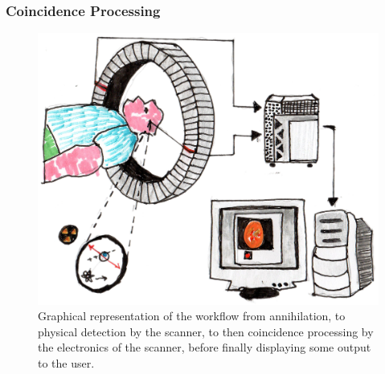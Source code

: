             
            \subsubsection{Coincidence Processing} \label{sec:coincidence_processing}
                
                \begin{figure}
                    \centering
                    
                    \includegraphics[width=1.0\linewidth]{figures/background_coincidence_processing.png}
                    
                    \captionsetup{singlelinecheck=false, justification=raggedright}
                    \caption{Graphical representation of the workflow from annihilation, to physical detection by the scanner, to then coincidence processing by the electronics of the scanner, before finally displaying some output to the user.} \label{fig:coincidence_processing_coincidence_processing}
                \end{figure}

